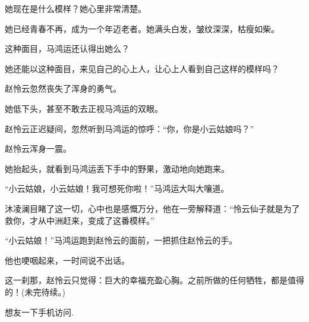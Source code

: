 \begin{this_body}
她现在是什么模样？她心里非常清楚。

她已经青春不再，成为一个年迈老者。她满头白发，皱纹深深，枯瘦如柴。

这种面目，马鸿运还认得出她么？

她还能以这种面目，来见自己的心上人，让心上人看到自己这样的模样吗？

赵怜云忽然丧失了浑身的勇气。

她低下头，甚至不敢去正视马鸿运的双眼。

赵怜云正迟疑间，忽然听到马鸿运的惊呼：“你，你是小云姑娘吗？”

赵怜云浑身一震。

她抬起头，就看到马鸿运丢下手中的野果，激动地向她跑来。

“小云姑娘，小云姑娘！我可想死你啦！”马鸿运大叫大嚷道。

沐凌澜目睹了这一切，心中也是感慨万分，他在一旁解释道：“怜云仙子就是为了救你，才从中洲赶来，变成了这番模样。”

“小云姑娘！”马鸿运跑到赵怜云的面前，一把抓住赵怜云的手。

他也哽咽起来，一时间说不出话。

这一刹那，赵怜云只觉得：巨大的幸福充盈心胸。之前所做的任何牺牲，都是值得的！(未完待续。)

想友一下手机访问.

\end{this_body}

